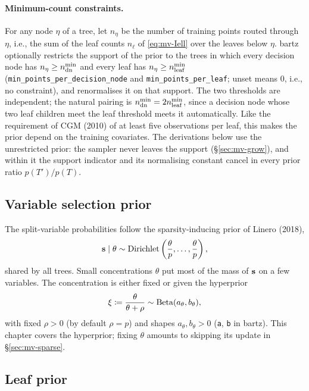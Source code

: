 \paragraph{Minimum-count constraints.}
For any node $\eta$ of a tree, let $n_\eta$ be the number of training
points routed through $\eta$, i.e., the sum of the leaf counts $n_\ell$ of
\eqref{eq:mv-Iell} over the leaves below $\eta$. bartz optionally restricts
the support of the prior to the trees in which every decision node has
$n_\eta \ge n^{\min}_{\mathrm{dn}}$ and every leaf has $n_\eta \ge n^{\min}_{\mathrm{leaf}}$
(\texttt{min\_points\_per\_decision\_node} and
\texttt{min\_points\_per\_leaf}; unset means $0$, i.e., no constraint), and
renormalises it on that support. The two thresholds are independent; the
natural pairing is $n^{\min}_{\mathrm{dn}} = 2n^{\min}_{\mathrm{leaf}}$, since a decision node whose two
leaf children meet the leaf threshold meets it automatically. Like the
requirement of CGM (2010) of at least five observations per leaf, this makes
the prior depend on the training covariates. The derivations below use the
unrestricted prior: the sampler never leaves the support
(\S\ref{sec:mv-grow}), and within it the support indicator and its
normalising constant cancel in every prior ratio $p(T')/p(T)$.

\subsection{Variable selection prior}
\label{sec:mv-sparse-prior}

The split-variable probabilities follow the sparsity-inducing prior of
Linero (2018),
\begin{equation}
	\label{eq:mv-s-prior}
	\mathbf{s} \mid \theta \sim \mathrm{Dirichlet}\left(\frac{\theta}{p}, \dots, \frac{\theta}{p}\right),
\end{equation}
shared by all trees. Small concentrations $\theta$ put most of the mass of
$\mathbf{s}$ on a few variables. The concentration is either fixed or given the
hyperprior
\begin{equation}
	\label{eq:mv-theta-prior}
	\xi \coloneqq \frac{\theta}{\theta + \rho} \sim \mathrm{Beta}(a_\theta, b_\theta),
\end{equation}
with fixed $\rho > 0$ (by default $\rho = p$) and shapes
$a_\theta, b_\theta > 0$ (\texttt{a}, \texttt{b} in bartz). This chapter
covers the hyperprior; fixing $\theta$ amounts to skipping its update in
\S\ref{sec:mv-sparse}.

\subsection{Leaf prior}
\label{sec:mv-leaf-prior}

